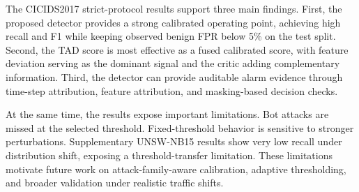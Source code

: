 The CICIDS2017 strict-protocol results support three main findings. First, the proposed detector provides a strong calibrated operating point, achieving high recall and F1 while keeping observed benign FPR below 5\% on the test split. Second, the TAD score is most effective as a fused calibrated score, with feature deviation serving as the dominant signal and the critic adding complementary information. Third, the detector can provide auditable alarm evidence through time-step attribution, feature attribution, and masking-based decision checks.

At the same time, the results expose important limitations. Bot attacks are missed at the selected threshold. Fixed-threshold behavior is sensitive to stronger perturbations. Supplementary UNSW-NB15 results show very low recall under distribution shift, exposing a threshold-transfer limitation. These limitations motivate future work on attack-family-aware calibration, adaptive thresholding, and broader validation under realistic traffic shifts.

